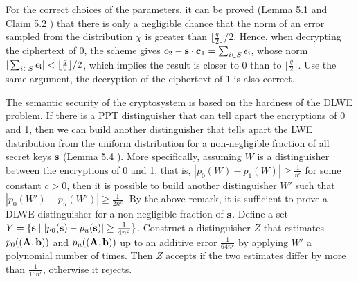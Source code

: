 \documentclass[../main.tex]{subfiles}
\begin{document}
For 
\reversemarginpar
{}
the correct choices of the parameters, it can be proved (Lemma 5.1 and Claim 5.2 \citep{regev2009lattices}) that there is only a negligible chance that the norm of an error sampled from the distribution $\chi$ is greater than $\lfloor \frac{q}{2}\rfloor/2$. Hence, when decrypting the ciphertext of 0, the scheme gives $c_2-\mathbf{s}\cdot \mathbf{c}_1=\sum_{i \in S} \mathbf{\epsilon_i}$, whose norm $|\sum_{i \in S} \mathbf{\epsilon_i}| < \lfloor \frac{q}{2}\rfloor/2$, which implies the result is closer to 0 than to $\lfloor \frac{q}{2}\rfloor$. Use the same argument, the decryption of the ciphertext of 1 is also correct. 

The
\reversemarginpar
{}
semantic security of the cryptosystem is based on the hardness of the DLWE problem. If there is a PPT distinguisher that can tell apart the encryptions of 0 and 1, then we can build another distinguisher that tells apart the LWE distribution from the uniform distribution for a non-negligible fraction of all secret keys $\mathbf{s}$ (Lemma 5.4 \citep{regev2009lattices}). More specifically, assuming $W$ is a distinguisher between the encryptions of 0 and 1, that is, $|p_0(W)-p_1(W)| \ge \frac{1}{n^c}$ for some constant $c > 0$, then it is possible to build another distinguisher $W'$ such that $|p_0(W')-p_u(W')| \ge \frac{1}{2n^c}$. By the above remark, it is sufficient to prove a DLWE distinguisher for a non-negligible fraction of $\mathbf{s}$. Define a set $Y=\{\mathbf{s} \mid |p_0(\mathbf{s})-p_u(\mathbf{s})| \ge \frac{1}{4n^c}\}$. Construct a distinguisher $Z$ that estimates $p_0((\mathbf{A},\mathbf{b}))$ and $p_u((\mathbf{A},\mathbf{b}))$ up to an additive error $\frac{1}{64n^c}$ by applying $W'$ a polynomial number of times. Then $Z$ accepts if the two estimates differ by more than $\frac{1}{16n^c}$, otherwise it rejects. 
\end{document}
